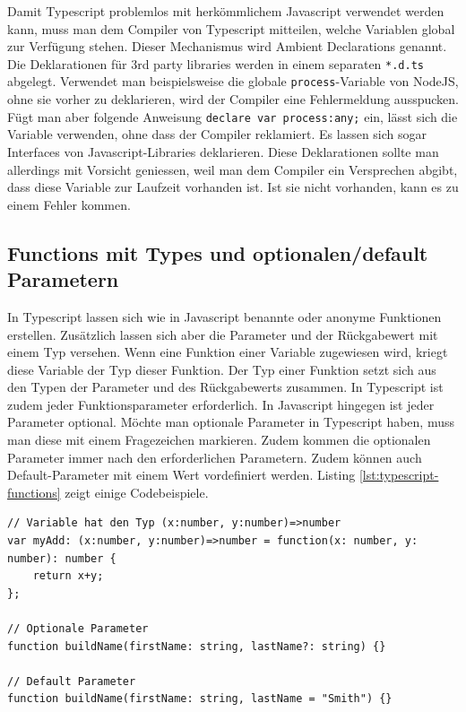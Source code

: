 Damit Typescript problemlos mit herkömmlichem Javascript verwendet werden kann, muss man dem Compiler von Typescript mitteilen, welche Variablen global zur Verfügung stehen. Dieser Mechanismus wird Ambient Declarations genannt. Die Deklarationen für 3rd party libraries werden in einem separaten \lstinline|*.d.ts| abgelegt. Verwendet man beispielsweise die globale \lstinline|process|-Variable von NodeJS, ohne sie vorher zu deklarieren, wird der Compiler eine Fehlermeldung ausspucken. Fügt man aber folgende Anweisung \lstinline|declare var process:any;| ein, lässt sich die Variable verwenden, ohne dass der Compiler reklamiert. Es lassen sich sogar Interfaces von Javascript-Libraries deklarieren. Diese Deklarationen sollte man allerdings mit Vorsicht geniessen, weil man dem Compiler ein Versprechen abgibt, dass diese Variable zur Laufzeit vorhanden ist. Ist sie nicht vorhanden, kann es zu einem Fehler kommen.

\subsection{Functions mit Types und optionalen/default Parametern}

In Typescript lassen sich wie in Javascript benannte oder anonyme Funktionen erstellen. Zusätzlich lassen sich aber die Parameter und der Rückgabewert mit einem Typ versehen. Wenn eine Funktion einer Variable zugewiesen wird, kriegt diese Variable der Typ dieser Funktion. Der Typ einer Funktion setzt sich aus den Typen der Parameter und des Rückgabewerts zusammen. In Typescript ist zudem jeder Funktionsparameter erforderlich. In Javascript hingegen ist jeder Parameter optional. Möchte man optionale Parameter in Typescript haben, muss man diese mit einem Fragezeichen markieren. Zudem kommen die optionalen Parameter immer nach den erforderlichen Parametern. Zudem können auch Default-Parameter mit einem Wert vordefiniert werden. Listing \ref{lst:typescript-functions} zeigt einige Codebeispiele.

\begin{lstlisting}[label=lst:typescript-functions,caption=Functions]
// Variable hat den Typ (x:number, y:number)=>number
var myAdd: (x:number, y:number)=>number = function(x: number, y: number): number { 
	return x+y; 
};

// Optionale Parameter
function buildName(firstName: string, lastName?: string) {}

// Default Parameter
function buildName(firstName: string, lastName = "Smith") {}
\end{lstlisting}

